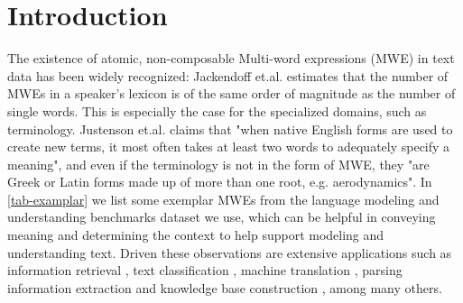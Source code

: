 


\section{Introduction}


The existence of atomic, non-composable Multi-word expressions (MWE) in text data has been widely recognized: Jackendoff et.al. \cite{jackendoff1997architecture} estimates that 
the number of MWEs in a speaker's lexicon is of the same order of magnitude as the number of single words.
This is especially the case for the specialized domains, such as terminology. 
Justenson et.al. \cite{justeson1995technical} claims that 
"when native English forms are used to create new terms, 
it most often takes at least two words to adequately specify a meaning", 
and even if the terminology is not in the form of MWE, they 
"are Greek or Latin forms made up of more than one root, e.g. aerodynamics". 
In \autoref{tab-examplar} we list some exemplar MWEs from the language modeling and understanding benchmarks dataset we use, 
which can be helpful in conveying meaning and determining the context 
to help support modeling and understanding text.
Driven these observations are extensive applications such as information retrieval \cite{xiong2015query, dalton2014entity, shen2018entity}, text classification \cite{furnkranz1998study}, machine translation \cite{koehn2003statistical}, parsing \cite{cafferkey2007multi, savary2015parseme} information extraction and knowledge base construction \cite{banko2007open, wu2012probase, ren2016automatic}, among many others.

